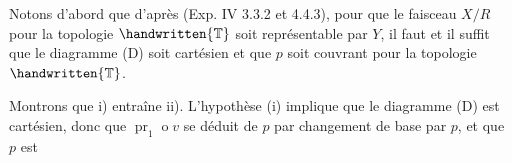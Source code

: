 Notons d'abord que d'après (Exp. IV 3.3.2 et 4.4.3), pour que le faisceau $X/R$  pour la topologie $\handwritten{\mathbb{T}}$ soit représentable par $Y$, il faut et il suffit que le diagramme (D) soit cartésien et que $p$ soit couvrant pour la topologie $\handwritten{\mathbb{T}}$.

Montrons que i) entraîne ii). L'hypothèse (i) implique que le diagramme (D) est cartésien, donc que $\operatorname{pr}_1\mathbin{o} v$ se déduit de $p$ par changement de base par $p$, et que $p$ est
